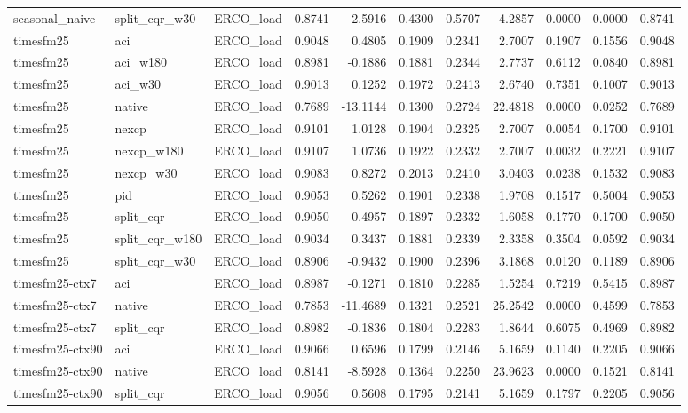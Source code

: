 \begin{tabular}{lllrrrrrrrr}
seasonal_naive & split_cqr_w30 & ERCO_load & 0.8741 & -2.5916 & 0.4300 & 0.5707 & 4.2857 & 0.0000 & 0.0000 & 0.8741 \\
timesfm25 & aci & ERCO_load & 0.9048 & 0.4805 & 0.1909 & 0.2341 & 2.7007 & 0.1907 & 0.1556 & 0.9048 \\
timesfm25 & aci_w180 & ERCO_load & 0.8981 & -0.1886 & 0.1881 & 0.2344 & 2.7737 & 0.6112 & 0.0840 & 0.8981 \\
timesfm25 & aci_w30 & ERCO_load & 0.9013 & 0.1252 & 0.1972 & 0.2413 & 2.6740 & 0.7351 & 0.1007 & 0.9013 \\
timesfm25 & native & ERCO_load & 0.7689 & -13.1144 & 0.1300 & 0.2724 & 22.4818 & 0.0000 & 0.0252 & 0.7689 \\
timesfm25 & nexcp & ERCO_load & 0.9101 & 1.0128 & 0.1904 & 0.2325 & 2.7007 & 0.0054 & 0.1700 & 0.9101 \\
timesfm25 & nexcp_w180 & ERCO_load & 0.9107 & 1.0736 & 0.1922 & 0.2332 & 2.7007 & 0.0032 & 0.2221 & 0.9107 \\
timesfm25 & nexcp_w30 & ERCO_load & 0.9083 & 0.8272 & 0.2013 & 0.2410 & 3.0403 & 0.0238 & 0.1532 & 0.9083 \\
timesfm25 & pid & ERCO_load & 0.9053 & 0.5262 & 0.1901 & 0.2338 & 1.9708 & 0.1517 & 0.5004 & 0.9053 \\
timesfm25 & split_cqr & ERCO_load & 0.9050 & 0.4957 & 0.1897 & 0.2332 & 1.6058 & 0.1770 & 0.1700 & 0.9050 \\
timesfm25 & split_cqr_w180 & ERCO_load & 0.9034 & 0.3437 & 0.1881 & 0.2339 & 2.3358 & 0.3504 & 0.0592 & 0.9034 \\
timesfm25 & split_cqr_w30 & ERCO_load & 0.8906 & -0.9432 & 0.1900 & 0.2396 & 3.1868 & 0.0120 & 0.1189 & 0.8906 \\
timesfm25-ctx7 & aci & ERCO_load & 0.8987 & -0.1271 & 0.1810 & 0.2285 & 1.5254 & 0.7219 & 0.5415 & 0.8987 \\
timesfm25-ctx7 & native & ERCO_load & 0.7853 & -11.4689 & 0.1321 & 0.2521 & 25.2542 & 0.0000 & 0.4599 & 0.7853 \\
timesfm25-ctx7 & split_cqr & ERCO_load & 0.8982 & -0.1836 & 0.1804 & 0.2283 & 1.8644 & 0.6075 & 0.4969 & 0.8982 \\
timesfm25-ctx90 & aci & ERCO_load & 0.9066 & 0.6596 & 0.1799 & 0.2146 & 5.1659 & 0.1140 & 0.2205 & 0.9066 \\
timesfm25-ctx90 & native & ERCO_load & 0.8141 & -8.5928 & 0.1364 & 0.2250 & 23.9623 & 0.0000 & 0.1521 & 0.8141 \\
timesfm25-ctx90 & split_cqr & ERCO_load & 0.9056 & 0.5608 & 0.1795 & 0.2141 & 5.1659 & 0.1797 & 0.2205 & 0.9056 \\

\end{tabular}
